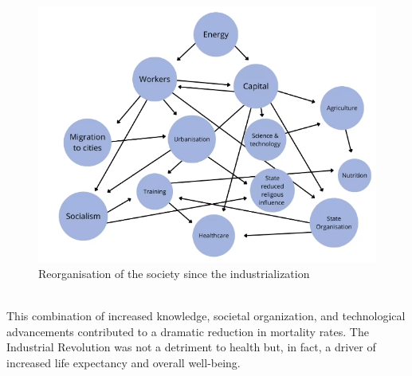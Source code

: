 \documentclass[../summary.tex]{subfiles}
\begin{document}
\begin{figure}[H]
	\centering
	\includegraphics[width=0.7\linewidth]{../images/reorganisation_society}
	\caption{Reorganisation of the society since the industrialization}
	\label{fig:reorganisationsociety}
\end{figure}
\ \\
This combination of increased knowledge, societal organization, and technological advancements contributed to a dramatic reduction in mortality rates. The Industrial Revolution was not a detriment to health but, in fact, a driver of increased life expectancy and overall well-being.
\end{document}

